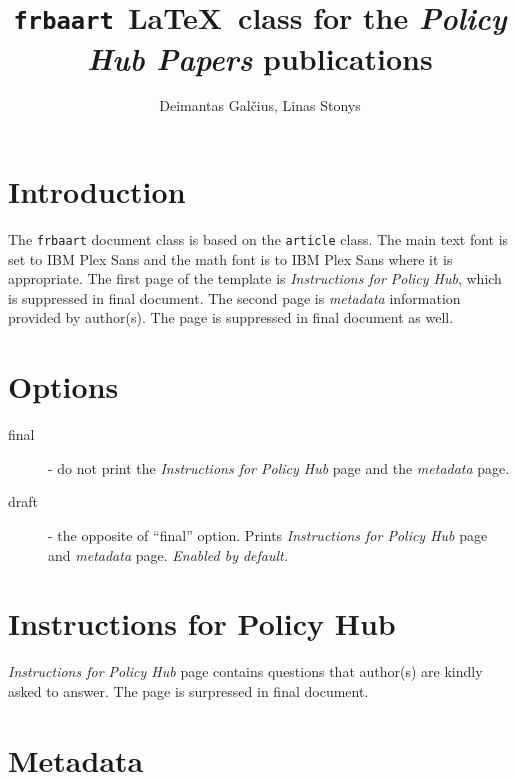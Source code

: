 \documentclass{ltxdoc}
\begin{document}
\title{\texttt{frbaart }\LaTeX\ class for the \textit{Policy Hub Papers} publications}
\author{Deimantas Galčius, Linas Stonys}
\maketitle


\tableofcontents

\section{Introduction}

The \texttt{frbaart} document class is based on the \texttt{article} class.
The main text font is set to IBM Plex Sans and the math font is to IBM Plex Sans
where it is appropriate.
The first page of the template is \textit{Instructions for Policy Hub},
which is suppressed in final document.
The second page is \textit{metadata} information provided
by author(s). The page is suppressed in final document as well.

\section{Options}

\begin{description}
\item[final] - do not print the \textit{Instructions for Policy Hub} page and
  the \textit{metadata} page.
\item[draft] - the opposite of ``final'' option. Prints \textit{Instructions for Policy Hub} page
  and \textit{metadata} page. \textit{Enabled by default.}
\end{description}

\section{Instructions for Policy Hub}

\textit{Instructions for Policy Hub} page contains questions
that author(s) are kindly asked to answer.
The page is surpressed in final document.

\section{Metadata}
\end{document}
